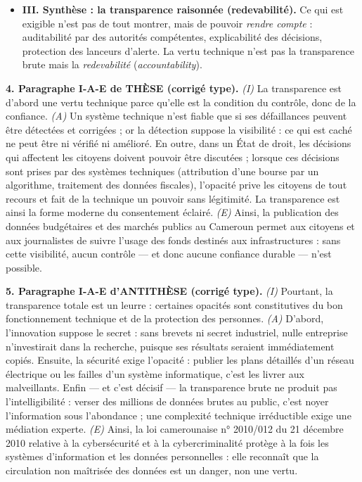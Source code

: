 \documentclass[11pt]{article}
\begin{document}
\begin{corrige}
\begin{itemize}
    \item \textbf{III. Synthèse : la transparence raisonnée (redevabilité).} Ce qui est exigible n'est pas de tout montrer, mais de pouvoir \emph{rendre compte} : auditabilité par des autorités compétentes, explicabilité des décisions, protection des lanceurs d'alerte. La vertu technique n'est pas la transparence brute mais la \emph{redevabilité} (\emph{accountability}).
\end{itemize}
\textbf{4. Paragraphe I-A-E de THÈSE (corrigé type).} \emph{(I)} La transparence est d'abord une vertu technique parce qu'elle est la condition du contrôle, donc de la confiance. \emph{(A)} Un système technique n'est fiable que si ses défaillances peuvent être détectées et corrigées ; or la détection suppose la visibilité : ce qui est caché ne peut être ni vérifié ni amélioré. En outre, dans un État de droit, les décisions qui affectent les citoyens doivent pouvoir être discutées ; lorsque ces décisions sont prises par des systèmes techniques (attribution d'une bourse par un algorithme, traitement des données fiscales), l'opacité prive les citoyens de tout recours et fait de la technique un pouvoir sans légitimité. La transparence est ainsi la forme moderne du consentement éclairé. \emph{(E)} Ainsi, la publication des données budgétaires et des marchés publics au Cameroun permet aux citoyens et aux journalistes de suivre l'usage des fonds destinés aux infrastructures : sans cette visibilité, aucun contrôle — et donc aucune confiance durable — n'est possible.\par
\textbf{5. Paragraphe I-A-E d'ANTITHÈSE (corrigé type).} \emph{(I)} Pourtant, la transparence totale est un leurre : certaines opacités sont constitutives du bon fonctionnement technique et de la protection des personnes. \emph{(A)} D'abord, l'innovation suppose le secret : sans brevets ni secret industriel, nulle entreprise n'investirait dans la recherche, puisque ses résultats seraient immédiatement copiés. Ensuite, la sécurité exige l'opacité : publier les plans détaillés d'un réseau électrique ou les failles d'un système informatique, c'est les livrer aux malveillants. Enfin — et c'est décisif — la transparence brute ne produit pas l'intelligibilité : verser des millions de données brutes au public, c'est noyer l'information sous l'abondance ; une complexité technique irréductible exige une médiation experte. \emph{(E)} Ainsi, la loi camerounaise n° 2010/012 du 21 décembre 2010 relative à la cybersécurité et à la cybercriminalité protège à la fois les systèmes d'information et les données personnelles : elle reconnaît que la circulation non maîtrisée des données est un danger, non une vertu.\par

\end{corrige}
\end{document}
